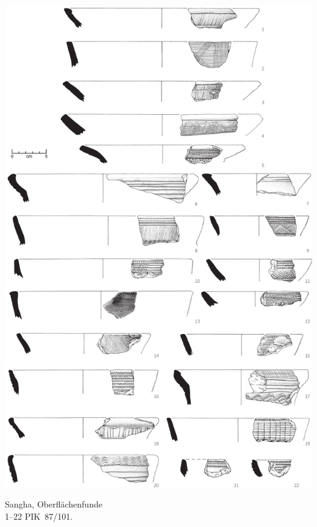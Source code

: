 \begin{pl}[H]
	\includegraphics{plt/Taf52.pdf}
	\vspace{.75em}\caption{\mbox{Sangha}, Oberflächenfunde \\ 1--22 PIK~87/101.}
	\label{pl:52}
\end{pl}

